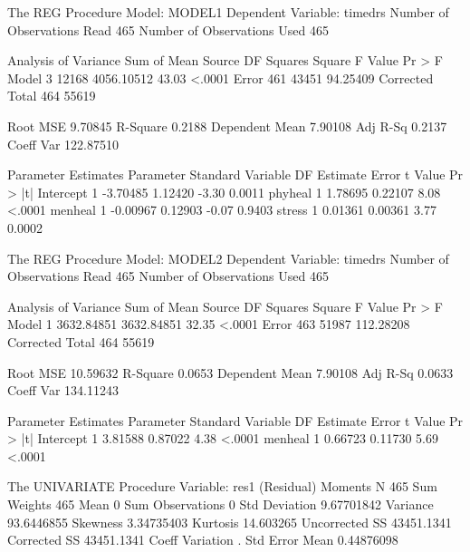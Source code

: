 \documentclass{article}
\begin{document}
\begin{Woutput}
The REG Procedure
Model: MODEL1
Dependent Variable: timedrs
Number of Observations Read         465
Number of Observations Used         465

                             Analysis of Variance
                                    Sum of           Mean
Source                   DF        Squares         Square    F Value    Pr > F
Model                     3          12168     4056.10512      43.03    <.0001
Error                   461          43451       94.25409
Corrected Total         464          55619

Root MSE              9.70845    R-Square     0.2188
Dependent Mean        7.90108    Adj R-Sq     0.2137
Coeff Var           122.87510

                        Parameter Estimates
                     Parameter       Standard
Variable     DF       Estimate          Error    t Value    Pr > |t|
Intercept     1       -3.70485        1.12420      -3.30      0.0011
phyheal       1        1.78695        0.22107       8.08      <.0001
menheal       1       -0.00967        0.12903      -0.07      0.9403
stress        1        0.01361        0.00361       3.77      0.0002

The REG Procedure
Model: MODEL2
Dependent Variable: timedrs
Number of Observations Read         465
Number of Observations Used         465

                             Analysis of Variance
                                    Sum of           Mean
Source                   DF        Squares         Square    F Value    Pr > F
Model                     1     3632.84851     3632.84851      32.35    <.0001
Error                   463          51987      112.28208
Corrected Total         464          55619

Root MSE             10.59632    R-Square     0.0653
Dependent Mean        7.90108    Adj R-Sq     0.0633
Coeff Var           134.11243

                        Parameter Estimates
                     Parameter       Standard
Variable     DF       Estimate          Error    t Value    Pr > |t|
Intercept     1        3.81588        0.87022       4.38      <.0001
menheal       1        0.66723        0.11730       5.69      <.0001

The UNIVARIATE Procedure
Variable:  res1  (Residual)
                            Moments
N                         465    Sum Weights                465
Mean                        0    Sum Observations             0
Std Deviation      9.67701842    Variance            93.6446855
Skewness           3.34735403    Kurtosis             14.603265
Uncorrected SS     43451.1341    Corrected SS        43451.1341
Coeff Variation             .    Std Error Mean      0.44876098


\end{Woutput}
\end{document}
